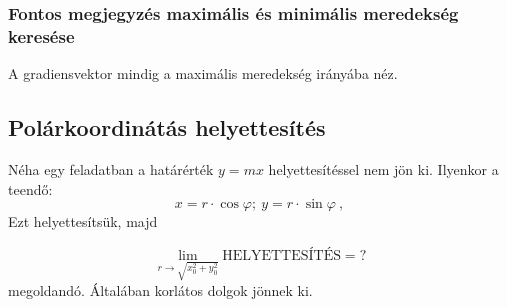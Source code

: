 \subsubsection*{Fontos megjegyzés maximális és minimális meredekség keresése}
A gradiensvektor mindig a maximális meredekség irányába néz.

\subsection*{Polárkoordinátás helyettesítés}
Néha egy feladatban a határérték $y = mx$ helyettesítéssel nem jön ki. Ilyenkor a teendő:
\[
  x = r \cdot \cos \varphi;\ y = r \cdot \sin \varphi\ ,
\]
Ezt helyettesítsük, majd

\begin{equation}
\lim_{r \rightarrow \sqrt{x_0^2 + y_0^2}} \text{HELYETTESÍTÉS} = ?
\end{equation}
megoldandó. Általában korlátos dolgok jönnek ki.


